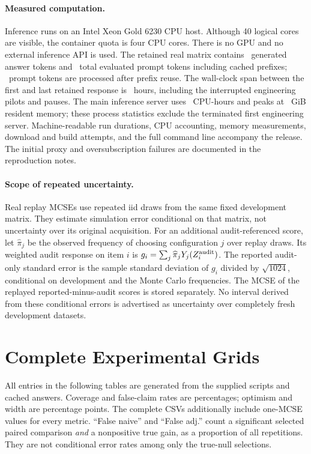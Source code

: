 \documentclass{article}
\begin{document}
\paragraph{Measured computation.}
Inference runs on an Intel Xeon Gold 6230 CPU host. Although 40 logical cores are visible, the container quota is four CPU cores. There is no GPU and no external inference API is used. The retained real matrix contains \TotalResponses\ generated answer tokens and \EvaluatedTokens\ total evaluated prompt tokens including cached prefixes; \ComputedTokens\ prompt tokens are processed after prefix reuse. The wall-clock span between the first and last retained response is \InferenceHours\ hours, including the interrupted engineering pilots and pauses. The main inference server uses \ServerCpuHours\ CPU-hours and peaks at \PeakMemoryGiB\ GiB resident memory; these process statistics exclude the terminated first engineering server. Machine-readable run durations, CPU accounting, memory measurements, download and build attempts, and the full command line accompany the release. The initial proxy and oversubscription failures are documented in the reproduction notes.

\paragraph{Scope of repeated uncertainty.}
Real replay MCSEs use repeated iid draws from the same fixed development matrix. They estimate simulation error conditional on that matrix, not uncertainty over its original acquisition. For an additional audit-referenced score, let $\widehat\pi_j$ be the observed frequency of choosing configuration $j$ over replay draws. Its weighted audit response on item $i$ is $g_i=\sum_j\widehat\pi_jY_j(Z_i^{\rm audit})$. The reported audit-only standard error is the sample standard deviation of $g_i$ divided by $\sqrt{1024}$, conditional on development and the Monte Carlo frequencies. The MCSE of the replayed reported-minus-audit scores is stored separately. No interval derived from these conditional errors is advertised as uncertainty over completely fresh development datasets.

\section{Complete Experimental Grids}\label{app:full}
All entries in the following tables are generated from the supplied scripts and cached answers. Coverage and false-claim rates are percentages; optimism and width are percentage points. The complete CSVs additionally include one-MCSE values for every metric. ``False naive'' and ``False adj.'' count a significant selected paired comparison \emph{and} a nonpositive true gain, as a proportion of all repetitions. They are not conditional error rates among only the true-null selections.
\end{document}

